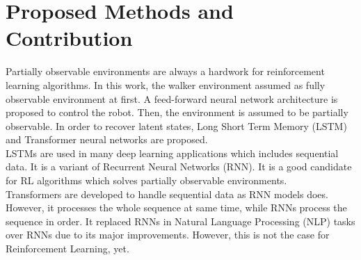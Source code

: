 \section{Proposed Methods and Contribution}
\label{sec:proposedmethods}
Partially observable environments are always a hardwork for reinforcement learning algorithms. In this work, the walker environment assumed as fully observable environment at first. A feed-forward neural network architecture is proposed to control the robot. Then, the environment is assumed to be partially observable. In order to recover latent states, Long Short Term Memory (LSTM) and Transformer neural networks are proposed. \\
LSTMs are used in many deep learning applications which includes sequential data. It is a variant of Recurrent Neural Networks (RNN). It is a good candidate for RL algorithms which solves partially observable environments. \\
Transformers are developed to handle sequential data as RNN models does. However, it processes the whole sequence at same time, while RNNs process the sequence in order. It replaced RNNs in Natural Language Processing (NLP) tasks over RNNs due to its major improvements. However, this is not the case for Reinforcement Learning, yet.
